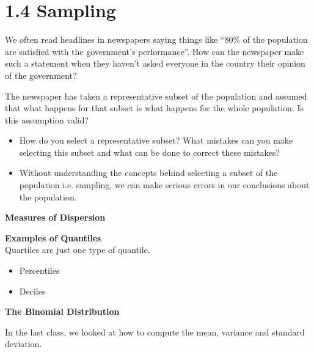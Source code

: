 

\section{1.4   Sampling}

We often read headlines in newspapers saying things like “80\% of the population are satisfied with the government’s performance”. How can the newspaper make such a statement when they haven’t asked everyone in the country their opinion of the government? 

The newspaper has taken a representative subset of the population and assumed that what happens for that subset is what happens for the whole population. Is this assumption valid? 





\begin{itemize}
\item 
How do you select a representative subset? What mistakes can you make selecting this subset and what can be done to correct these mistakes? 
\item Without understanding the concepts behind selecting a subset of the population i.e. sampling, we can make serious errors in our conclusions about the population.  
\end{itemize}







\textbf{Measures of Dispersion}

\textbf{Examples of Quantiles}\\
Quartiles are just one type of quantile.
\begin{itemize}
\item Percentiles
\item Deciles
\end{itemize}






\textbf{The Binomial Distribution}



In the last class, we looked at how to compute the mean, variance and standard deviation. 

